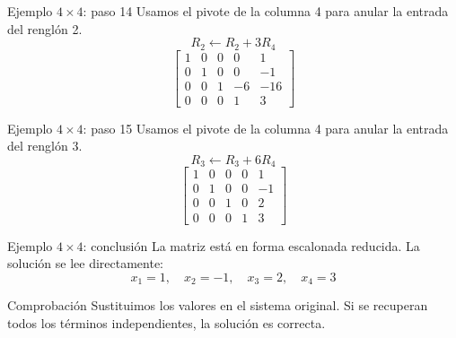 \documentclass[aspectratio=169,9pt]{beamer}
\theoremstyle{remark}
\begin{document}
\begin{frame}[t]{Ejemplo $4\times4$: paso 14}
Usamos el pivote de la columna 4 para anular la entrada del renglón 2.
\[
R_{2}\leftarrow R_{2}+3R_{4}
\]
\[
\left[\begin{array}{cccc|c}
1 & 0 & 0 & 0 & 1\\
0 & 1 & 0 & 0 & -1\\
0 & 0 & 1 & -6 & -16\\
0 & 0 & 0 & 1 & 3
\end{array}\right]
\]
\end{frame}
\begin{frame}[t]{Ejemplo $4\times4$: paso 15}
Usamos el pivote de la columna 4 para anular la entrada del renglón 3.
\[
R_{3}\leftarrow R_{3}+6R_{4}
\]
\[
\left[\begin{array}{cccc|c}
1 & 0 & 0 & 0 & 1\\
0 & 1 & 0 & 0 & -1\\
0 & 0 & 1 & 0 & 2\\
0 & 0 & 0 & 1 & 3
\end{array}\right]
\]
\end{frame}
\begin{frame}[t]{Ejemplo $4\times4$: conclusión}
La matriz está en forma escalonada reducida. La solución se lee directamente:
\[
\boxed{x_{1}=1,\quad x_{2}=-1,\quad x_{3}=2,\quad x_{4}=3}
\]
\begin{block}{Comprobación}
Sustituimos los valores en el sistema original. Si se recuperan todos los términos independientes, la solución es correcta.
\end{block}
\end{frame}
\end{document}
